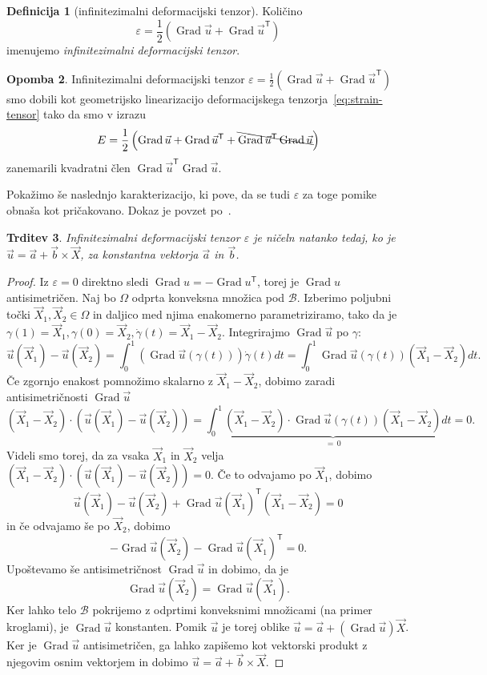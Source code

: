 \documentclass[12pt,a4paper,twoside]{article}
\theoremstyle{definition} %
\newtheorem{definicija}{Definicija}[section]
\newtheorem{opomba}[definicija]{Opomba}
\theoremstyle{plain} %
\newtheorem{trditev}[definicija]{Trditev}
\numberwithin{equation}{section}
\newcommand{\B}{\mathcal{B}}
\newcommand{\T}{\mathsf{T}}
\newcommand{\Grad}{\operatorname{Grad}}
\newcommand{\eps}{\varepsilon}
\newcommand{\vu}{\vec{u}}
\newcommand{\va}{\vec{a}}
\newcommand{\vb}{\vec{b}}
\newcommand{\vX}{\vec{X}}
\newcommand{\vXX}{\vec{X}_1}
\newcommand{\vY}{\vec{X}_2}
\begin{document}
\begin{definicija}[infinitezimalni deformacijski tenzor]
  Količino
  \begin{equation}
    \eps = \frac{1}{2}(\Grad \vu + \Grad \vu^\T)
    \label{eq:eps}
  \end{equation}
  imenujemo \emph{infinitezimalni deformacijski tenzor}.
\end{definicija}
\begin{opomba}
  \label{op:linear-strain}
  Infinitezimalni deformacijski tenzor $\eps = \frac{1}{2}(\Grad \vu + \Grad \vu^\T)$ smo dobili kot
  geometrijsko linearizacijo deformacijskega tenzorja~\eqref{eq:strain-tensor} tako da smo v izrazu
  \begin{equation}
    E = \frac12\left( \Grad \vu + \Grad \vu^\T + \bcancel{\Grad \vu^\T \Grad \vu} \right)
  \end{equation}
  zanemarili kvadratni člen $\Grad \vu^\T \Grad \vu$.
\end{opomba}

Pokažimo še naslednjo karakterizacijo, ki pove, da se tudi $\eps$ za toge pomike
obnaša kot pričakovano. Dokaz je povzet po~\cite[str.\ 56]{gurtin1982introduction}.
\begin{trditev}
  \label{trd:eps-0}
  Infinitezimalni deformacijski tenzor $\eps$ je ničeln natanko tedaj, ko je
  $\vu = \va + \vb \times \vX$, za konstantna vektorja $\va$ in $\vb$.
\end{trditev}
\begin{proof}
  Iz $\eps = 0$ direktno sledi $\Grad u = -\Grad u^\T$, torej je $\Grad u$ antisimetričen.
  Naj bo $\Omega$ odprta konveksna množica pod $\B$.  Izberimo poljubni točki $\vXX, \vY \in \Omega$
  in daljico med njima enakomerno parametriziramo, tako da je $\gamma(1) = \vXX, \gamma(0) = \vY,
  \dot\gamma(t) = \vXX-\vY$. Integrirajmo $\Grad \vu$ po $\gamma$:
  \[
    \vu(\vXX) - \vu(\vY) = \int_0^1 (\Grad\vu(\gamma(t)))\dot\gamma(t)dt =
    \int_0^1\Grad\vu(\gamma(t))(\vXX-\vY) dt.
  \]
  Če zgornjo enakost pomnožimo skalarno z $\vXX-\vY$, dobimo zaradi antisimetričnosti $\Grad \vu$
  \[
    (\vXX - \vY)\cdot (\vu(\vXX) - \vu(\vY)) =
    \int_0^1\underbrace{(\vXX - \vY)\cdot \Grad\vu(\gamma(t))(\vXX-\vY)}_{=\,0} dt = 0.
  \]
  Videli smo torej, da za vsaka $\vXX$ in $\vY$ velja $(\vXX - \vY)\cdot (\vu(\vXX) - \vu(\vY)) = 0$.
  Če to odvajamo po $\vXX$, dobimo
  \[
    \vu(\vXX) - \vu(\vY) + \Grad\vu(\vXX)^\T(\vXX - \vY) = 0
  \]
  in če odvajamo še po $\vY$, dobimo
  \[
    - \Grad \vu(\vY) - \Grad\vu(\vXX)^\T = 0.
  \]
  Upoštevamo še antisimetričnost $\Grad\vu$ in dobimo, da je
  \[
    \Grad \vu(\vY) = \Grad\vu(\vXX).
  \]
  Ker lahko telo $\B$ pokrijemo z odprtimi konveksnimi množicami (na primer kroglami),
  je $\Grad\vu$ konstanten. Pomik $\vu$ je torej oblike $\vu = \va + (\Grad\vu) \vX$.
  Ker je $\Grad \vu$ antisimetričen, ga lahko zapišemo kot vektorski produkt z
  njegovim osnim vektorjem in dobimo $\vu = \va + \vb \times \vX$.
\end{proof}
\end{document}
